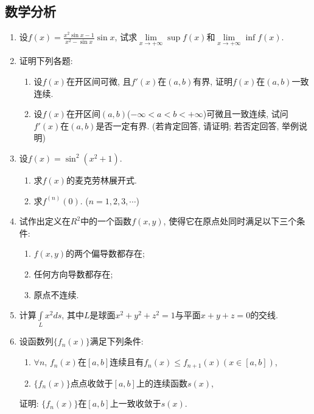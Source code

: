 \documentclass[12pt,a4paper,openany]{book}
\begin{document}
\subsection{数学分析}
\begin{enumerate}
\item 设$f(x) = \displaystyle\frac{x^2\sin{x} - 1}{x^2 - \sin{x}}\sin{x}$, 试求$\lim\limits_{x \rightarrow +\infty}{\sup{f(x)}}$和$\lim\limits_{x \rightarrow +\infty}{\inf{f(x)}}$.

\item 证明下列各题:
\begin{enumerate}
\item 设$f(x)$在开区间可微, 且$f'(x)$在$(a, b)$有界, 证明$f(x)$在$(a, b)$一致连续.

\item 设$f(x)$在开区间$(a, b)$($-\infty < a < b < +\infty$)可微且一致连续, 试问$f'(x)$在$(a, b)$是否一定有界. (若肯定回答, 请证明; 若否定回答, 举例说明)
\end{enumerate}

\item 设$f(x) = \sin^2{(x^2 + 1)}$.
\begin{enumerate}
\item 求$f(x)$的麦克劳林展开式.
\item 求$f^{(n)}(0)$. ($n = 1, 2, 3, \cdots$)
\end{enumerate}

\item 试作出定义在$R^2$中的一个函数$f(x, y)$, 使得它在原点处同时满足以下三个条件:
\begin{enumerate}
\item $f(x, y)$的两个偏导数都存在;
\item 任何方向导数都存在;
\item 原点不连续.
\end{enumerate}

\item 计算$\displaystyle\int\limits_{L}{x^2ds}$, 其中$L$是球面$x^2 + y^2 + z^2 = 1$与平面$x + y + z = 0$的交线.

\item 设函数列$\{f_n(x)\}$满足下列条件:
\begin{enumerate}
\item $\forall n$, $f_n(x)$在$[a, b]$连续且有$f_n(x) \le f_{n+1}(x)(x \in [a, b])$,
\item $\{f_n(x)\}$点点收敛于$[a, b]$上的连续函数$s(x)$,
\end{enumerate}
证明: $\{f_n(x)\}$在$[a, b]$上一致收敛于$s(x)$.

\end{enumerate}
\end{document}
